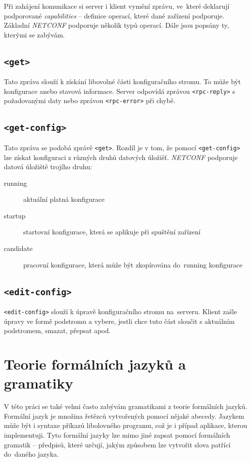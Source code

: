 \documentclass[thesis=B,czech,hidelinks]{FITthesis}[2019/03/06]
\begin{document}
Při zahájení komunikace si server i klient vymění  zprávu, ve~které deklarují podporované \textit{capabilities} -- definice operací, které dané zařízení podporuje. Základní \textit{NETCONF} podporuje několik typů operací. Dále jsou popsány ty, kterými se zabývám.

\subsection{\texttt{<get>}}
Tato zpráva slouží k získání libovolné části konfiguračního stromu. To může být konfigurace anebo stavová informace. Server odpovídá zprávou \texttt{<rpc-reply>} s požadovanými daty nebo zprávou \texttt{<rpc-error>} při chybě.

\subsection{\texttt{<get-config>}}
Tato zpráva se podobá zprávě \texttt{<get>}. Rozdíl je v tom, že pomocí \texttt{<get-config>} lze získat konfiguraci z různých druhů datových úložišť. \textit{NETCONF} podporuje datová úložiště trojího druhu:
\begin{description}
    \item[running]{aktuální platná konfigurace}
    \item[startup]{startovní konfigurace, která se aplikuje při spuštění zařízení}
    \item[candidate]{pracovní konfigurace, která může být zkopírována do~running konfigurace}
\end{description}

\subsection{\texttt{<edit-config>}}
\texttt{<edit-config>} slouží k úpravě konfiguračního stromu na~serveru. Klient zašle úpravy ve formě podstromu a vybere, jestli chce tuto část sloučit s aktuálním podstromem, smazat, přepsat apod.

\section{Teorie formálních jazyků a gramatiky}
V této práci se také velmi často zabývám gramatikami z teorie formálních jazyků. Formální jazyk je množina řetězců vytvořených pomocí nějaké abecedy. Jazykem může být i syntaxe příkazů libolovného programu, což je i případ aplikace, kterou implementuji. Tyto formální jazyky lze mimo jiné zapsat pomocí formálních gramatik -- předpisů, které určují, jakým způsobem  lze vytvořit slova patřící do~daného jazyka.\,\cite{formal-languages}
\end{document}
